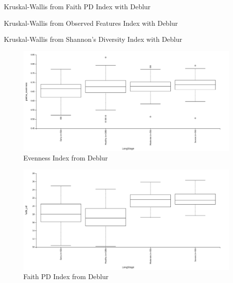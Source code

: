 \documentclass[a4paper]{article}
\begin{document}
            \begin{table}[p]
                \centering
                \caption{Kruskal-Wallis from Faith PD Index with Deblur}
                \label{tb:alpha-faith-deblur}
            \end{table}

            \begin{table}[p]
                \centering
                \caption{Kruskal-Wallis from Observed Features Index with Deblur}
                \label{tb:alpha-observed-deblur}
            \end{table}

            \begin{table}[p]
                \centering
                \caption{Kruskal-Wallis from Shannon's Diversity Index with Deblur}
                \label{tb:alpha-shannon-deblur}
            \end{table}

            \begin{figure}[p]
                \centering
                \includegraphics[width=0.8 \linewidth]{figures/AlphaDiversity/Deblur/evenness.png}
                \caption{Evenness Index from Deblur}
                \label{fig:evenness-deblur}
            \end{figure}

            \begin{figure}[p]
                \centering
                \includegraphics[width=0.8 \linewidth]{figures/AlphaDiversity/Deblur/faith.png}
                \caption{Faith PD Index from Deblur}
                \label{fig:faith-deblur}
            \end{figure}
\end{document}
